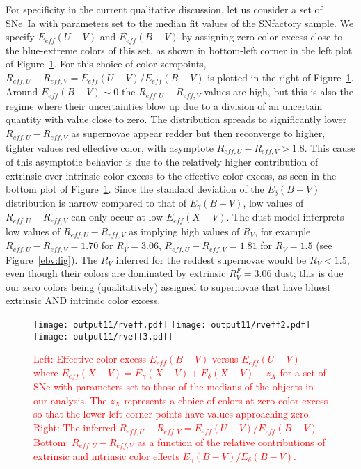 \documentclass{aastex}   	%
\begin{document}
For specificity in the current qualitative discussion, 
let us consider a set of SNe~Ia  with parameters set to the median fit values of the SNfactory sample.
We specify   $E_{eff}(U-V)$  and $E_{eff}(B-V)$ by
assigning zero color excess close to the blue-extreme colors of this set, 
as shown in bottom-left corner in the left plot of Figure~\ref{rveff:fig}.
For this choice of color zeropoints,
$R_{eff,U} - R_{eff,V} = E_{eff}(U-V) /E_{eff}(B-V)$ is plotted
in the right of Figure~\ref{rveff:fig}.
Around $E_{eff}(B-V) \sim 0$ the $R_{eff,U} - R_{eff,V}$ values are high, but this is also the regime where their  uncertainties 
blow up due to a division of an uncertain quantity with value close to zero.
The distribution spreads to significantly 
lower   $R_{eff,U} - R_{eff,V}$ as supernovae appear redder but
then reconverge to higher, tighter values red effective color, with asymptote  $R_{eff,U} - R_{eff,V} >1.8$.
This cause of this asymptotic behavior is due to the relatively higher contribution of extrinsic over intrinsic color excess to the effective color excess, as
seen in the bottom plot of
Figure~\ref{rveff:fig}. 
Since the standard deviation of the $E_\delta(B-V)$ distribution is  narrow compared to that of
 $E_\gamma(B-V)$, low values of $R_{eff,U} - R_{eff,V}$ can only occur
at low $E_{eff}(X-V)$.
 The  \citet{1999PASP..111...63F} dust model interprets
 low values of $R_{eff,U} - R_{eff,V}$ as implying high values of $R_V$,
for example $R_{eff,U} - R_{eff,V}=1.70$ for $R_V=3.06$,  $R_{eff,U} - R_{eff,V}=1.81$ for $R_V=1.5$ (see Figure~\ref{ebv:fig}).
The $R_V$ inferred for the reddest supernovae would be $R_V<1.5$, even though their colors are dominated by 
extrinsic $R^F_V=3.06$ dust; this is due our zero colors being (qualitatively) assigned to supernovae that have bluest extrinsic AND intrinsic color excess.
\begin{figure}[htbp] %
   \centering
   \texttt{[image: output11/rveff.pdf]}
   \texttt{[image: output11/rveff2.pdf]}
   \texttt{[image: output11/rveff3.pdf]}
      \caption{\textcolor{red}{Left: Effective color excess $E_{eff}(B-V)$ versus $E_{eff}(U-V)$
   where $E_{eff}(X-V)   = E_\gamma(X-V) + E_\delta(X-V) - z_X$
   for a set of SNe with parameters set to those of the medians of the objects in our analysis.
   The $z_X$ represents a choice of colors at zero color-excess so that the lower left corner points have values approaching zero. 
Right:  The inferred $R_{eff,U}- R_{eff,V} = E_{eff}(U-V)/E_{eff}(B-V)$.
Bottom:  $R_{eff,U}- R_{eff,V}$ as a function of the relative contributions of extrinsic and intrinsic color effects $E_\gamma(B-V)/E_\delta(B-V)$.}
   \label{rveff:fig}}
\end{figure}
\end{document}
